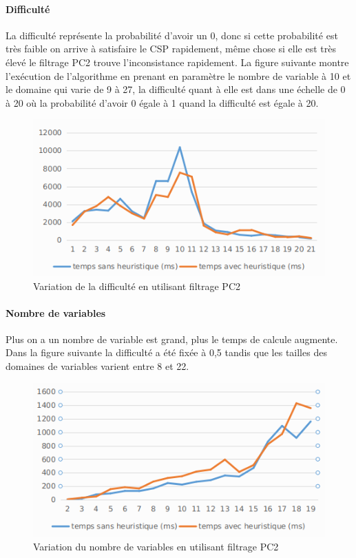 \documentclass[12pt]{report}
\begin{document}
\paragraph{Difficulté}
La difficulté représente la probabilité d’avoir un 0, donc si cette probabilité est très faible on arrive à satisfaire le CSP rapidement, même chose si elle est très élevé le filtrage PC2 trouve l’inconsistance rapidement. La figure suivante montre l'exécution de l'algorithme en prenant en paramètre le nombre de variable à 10 et le domaine qui varie de 9 à 27, la difficulté quant à elle est dans une échelle de 0 à 20 où la probabilité d’avoir 0 égale à 1 quand la difficulté est égale à 20.
\begin{figure}[H]
	\centering
	\includegraphics[scale=0.5]{imgs/random2.png}
	\caption{Variation de la difficulté en utilisant filtrage PC2}
	\label{fig:diff}
\end{figure}
\paragraph{Nombre de variables}
Plus on a un nombre de variable est grand, plus le temps de calcule augmente. Dans la figure suivante la difficulté a été fixée à 0,5 tandis que les tailles des domaines de variables varient entre 8 et 22.
\begin{figure}[H]
	\centering
	\includegraphics[scale=0.5]{imgs/variables.png}
	\caption{Variation du nombre de variables en utilisant filtrage PC2}
	\label{fig:vars}
\end{figure}
\end{document}
